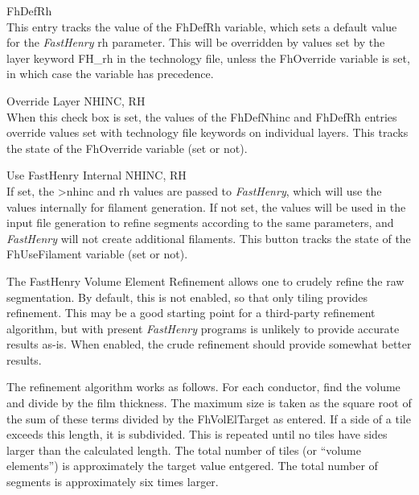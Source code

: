\begin{description}
\item{\cb FhDefRh}\\
This entry tracks the value of the {\et FhDefRh} variable,
which sets a default value for the {\it FastHenry} {\vt rh}
parameter.  This will be overridden by values set by the layer
keyword {\vt FH\_rh} in the technology file, unless the {\et
FhOverride} variable is set, in which case the variable has
precedence.

\item{\cb Override Layer NHINC, RH}\\
When this check box is set, the values of the {\cb FhDefNhinc}
and {\cb FhDefRh} entries override values set with technology
file keywords on individual layers.  This tracks the state of
the {\et FhOverride} variable (set or not).

\item{\cb Use FastHenry Internal NHINC, RH}\\
If set, the {\vt >nhinc} and {\vt rh} values are passed to
{\it FastHenry\/}, which will use the values internally for
filament generation.  If not set, the values will be used in
the input file generation to refine segments according to the
same parameters, and {\it FastHenry} will not create
additional filaments.  This button tracks the state of the
{\et FhUseFilament} variable (set or not).

\end{description}

The {\cb FastHenry Volume Element Refinement} allows one to
crudely refine the raw segmentation.  By default, this is not
enabled, so that only tiling provides refinement.  This may be
a good starting point for a third-party refinement algorithm,
but with present {\it FastHenry} programs is unlikely to
provide accurate results as-is.  When enabled, the crude
refinement should provide somewhat better results.

The refinement algorithm works as follows.  For each
conductor, find the volume and divide by the film thickness. 
The maximum size is taken as the square root of the sum of
these terms divided by the {\et FhVolElTarget} as entered.  If
a side of a tile exceeds this length, it is subdivided.  This
is repeated until no tiles have sides larger than the
calculated length.  The total number of tiles (or ``volume
elements'') is approximately the target value entgered.  The
total number of segments is approximately six times larger.

